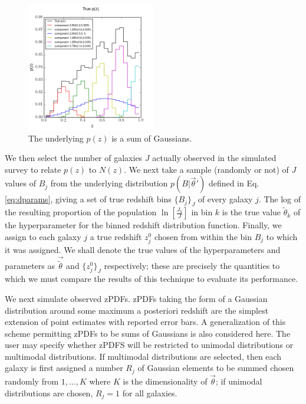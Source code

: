 \documentclass[preprint]{aastex}
\begin{document}
\begin{figure}
\label{fig:physPz}
\includegraphics[width=0.5\textwidth]{physPz.png}
\caption{The underlying $p(z)$ is a sum of Gaussians.}
\end{figure}

We then select the number of galaxies $J$ actually observed in the simulated survey to relate $p(z)$ to $N(z)$.  We next take a sample (randomly or not) of $J$ values of $B_{j}$ from the underlying distribution $p(B|\vec{\theta}')$ defined in Eq. \ref{eq:dparams}, giving a set of true redshift bins $\{B_{j}\}_{J}$ of every galaxy $j$.  The log of the resulting proportion of the population $\ln[\frac{J_{k}}{J}]$ in bin $k$ is the true value $\tilde{\theta}_{k}$ of the hyperparameter for the binned redshift distribution function.  Finally, we assign to each galaxy $j$ a true redshift $z_{j}^{0}$ chosen from within the bin $B_{j}$ to which it was assigned.  We shall denote the true values of the hyperparameters and parameters as $\vec{\tilde{\theta}}$ and $\{z_{j}^{0}\}_{J}$ respectively; these are precisely the quantities to which we must compare the results of this technique to evaluate its performance.

We next simulate observed zPDFs.  zPDFs taking the form of a Gaussian distribution around some maximum a posteriori redshift are the simplest extension of point estimates with reported error bars.  A generalization of this scheme permitting zPDFs to be sums of Gaussians is also considered here.  The user may specify whether zPDFS will be restricted to unimodal distributions or multimodal distributions.  If multimodal distributions are selected, then each galaxy is first assigned a number $R_{j}$ of Gaussian elements to be summed chosen randomly from $1,\dots,K$ where $K$ is the dimensionality of $\vec{\theta}$; if unimodal distributions are chosen, $R_{j}=1$ for all galaxies.  
\end{document}
